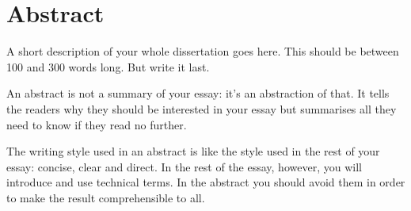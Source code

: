 \chapter*{Abstract}
%
%
A short description of your whole dissertation goes here. This should be between 100 and 300 words long. But write it last.

An abstract is not a summary of your essay: it's an abstraction of that. 
It tells the readers why they should be interested in your essay but summarises all 
they need to know if they read no further.

The writing style used in an abstract is like the style used in the rest of your essay: concise, clear and direct. 
In the rest of the essay, however, you will introduce and use technical terms. In the abstract you should
avoid them in order to make the result comprehensible to all.